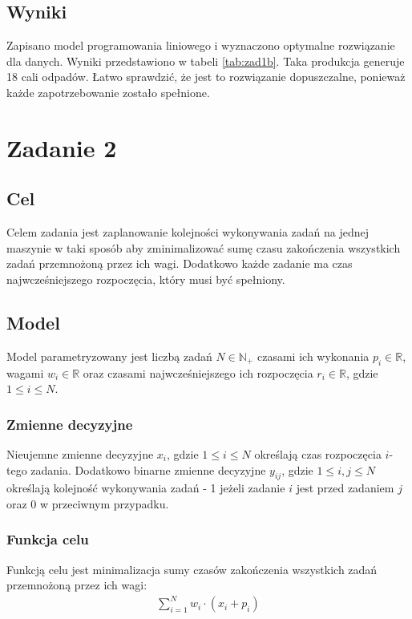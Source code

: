 \documentclass{article}
\begin{document}
\subsection{Wyniki}
Zapisano model programowania liniowego i wyznaczono optymalne rozwiązanie dla danych. 
Wyniki przedstawiono w tabeli \ref{tab:zad1b}. Taka produkcja generuje 18 cali odpadów. 
Łatwo sprawdzić, że jest to rozwiązanie dopuszczalne, ponieważ każde zapotrzebowanie zostało spełnione.

\section{Zadanie 2}
\subsection{Cel}
Celem zadania jest zaplanowanie kolejności wykonywania zadań na jednej maszynie w taki sposób aby zminimalizować sumę czasu zakończenia wszystkich zadań przemnożoną przez ich wagi.
Dodatkowo każde zadanie ma czas najwcześniejszego rozpoczęcia, który musi być spełniony.

\subsection{Model}
Model parametryzowany jest liczbą zadań $N \in \mathbb{N}_+$ czasami ich wykonania $p_i \in \mathbb{R}$, wagami $w_i \in \mathbb{R}$ oraz czasami najwcześniejszego ich rozpoczęcia $r_i \in \mathbb{R}$, gdzie $1 \leq i \leq N$.

\subsubsection{Zmienne decyzyjne}
Nieujemne zmienne decyzyjne $x_i$, gdzie $1 \leq i \leq N$ określają czas rozpoczęcia $i$-tego zadania.
Dodatkowo binarne zmienne decyzyjne $y_{ij}$, gdzie $1 \leq i,j \leq N$ określają kolejność wykonywania zadań - 1 jeżeli zadanie $i$ jest przed zadaniem $j$ oraz 0 w przeciwnym przypadku.

\subsubsection{Funkcja celu}
Funkcją celu jest minimalizacja sumy czasów zakończenia wszystkich zadań przemnożoną przez ich wagi:
\begin{align*}
    \sum_{i=1}^{N} w_i \cdot (x_i + p_i)
\end{align*}
\end{document}
